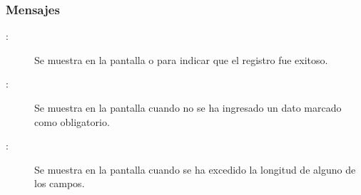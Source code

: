 \subsubsection{Mensajes}

	
\begin{description}

	\item[ :] Se muestra en la pantalla  o  para indicar que el registro fue exitoso.
	\item[ :] Se muestra en la pantalla  cuando no se ha ingresado un dato marcado como obligatorio.
	\item[ :] Se muestra en la pantalla  cuando se ha excedido la longitud de alguno de los campos.
\end{description}
